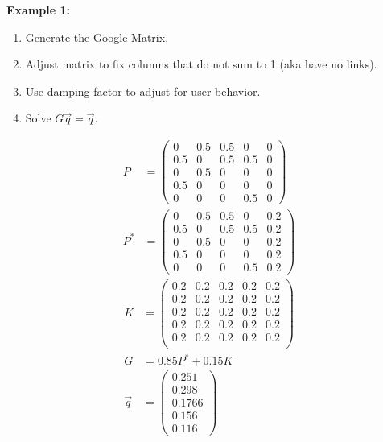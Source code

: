 \noindent
\newline
\textbf{Example 1:}
\begin{enumerate}
    \item Generate the Google Matrix.
    \item Adjust matrix to fix columns that do not sum to 1 (aka have no links).
    \item Use damping factor to adjust for user behavior.
    \item Solve \(G\Vec{q}=\Vec{q}\).
\end{enumerate}
\begin{align}
    P &= \begin{pmatrix}
        0 & 0.5 & 0.5 & 0 & 0 \\
        0.5 & 0 & 0.5 & 0.5 & 0 \\
        0 & 0.5 & 0 & 0 & 0 \\
        0.5 & 0 & 0 & 0 & 0 \\
        0 & 0 & 0 & 0.5 & 0
    \end{pmatrix} \\
    P^* &= \begin{pmatrix}
        0 & 0.5 & 0.5 & 0 & 0.2 \\
        0.5 & 0 & 0.5 & 0.5 & 0.2 \\
        0 & 0.5 & 0 & 0 & 0.2 \\
        0.5 & 0 & 0 & 0 & 0.2 \\
        0 & 0 & 0 & 0.5 & 0.2
    \end{pmatrix}
\end{align}
\begin{align}
    K &= \begin{pmatrix}
        0.2 & 0.2 & 0.2 & 0.2 & 0.2 \\
        0.2 & 0.2 & 0.2 & 0.2 & 0.2 \\
        0.2 & 0.2 & 0.2 & 0.2 & 0.2 \\
        0.2 & 0.2 & 0.2 & 0.2 & 0.2 \\
        0.2 & 0.2 & 0.2 & 0.2 & 0.2 \\
    \end{pmatrix} \\
    G &= 0.85 P^* + 0.15 K \\
    \Vec{q} &= \begin{pmatrix}
        0.251 \\ 0.298 \\ 0.1766 \\ 0.156 \\ 0.116
    \end{pmatrix}
\end{align}

